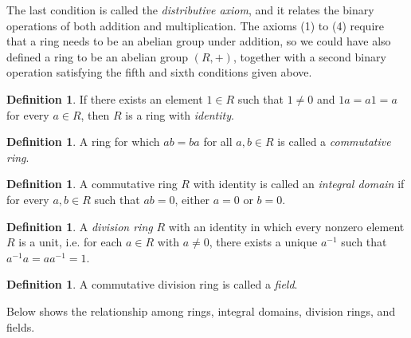 \documentclass[11pt]{book}
\theoremstyle{definition}\newtheorem{definition}[subsection]{Definition}
\theoremstyle{definition}\newtheorem{example}[subsection]{Example}
\theoremstyle{definition}\newtheorem{notation}[subsection]{Notation}
\theoremstyle{definition}\newtheorem{remark}[subsection]{Remark}
\theoremstyle{theorem}\newtheorem{theorem}[subsection]{Theorem}
\theoremstyle{theorem}\newtheorem{lemma}[subsection]{Lemma}
\theoremstyle{theorem}\newtheorem{proposition}[subsection]{Proposition}
\theoremstyle{theorem}\newtheorem{corollary}[subsection]{Corollary}
\begin{document}
The last condition is called the \emph{distributive axiom}, and it relates the binary operations of both addition and multiplication. The axioms (1) to (4) require that a ring needs to be an abelian group under addition, so we could have also defined a ring to be an abelian group $(R, +)$, together with a second binary operation satisfying the fifth and sixth conditions given above.   

\begin{definition}\label{definition:1.1.2} 
    If there exists an element $1 \in R$ such that $1 \neq 0$ and $1a = a1 = a$ for every $a \in R$, then $R$ is a ring with \emph{identity}.
\end{definition}

\begin{definition}\label{definition:1.1.3} 
    A ring for which $ab = ba$ for all $a, b \in R$ is called a \emph{commutative ring}.
\end{definition}

\begin{definition}\label{definition:1.1.4}
    A commutative ring $R$ with identity is called an \emph{integral domain} if for every $a, b \in R$ such that $ab = 0$, either $a = 0$ or $b = 0$.
\end{definition}

\begin{definition}\label{definition:1.1.5}
    A \emph{division ring} $R$ with an identity in which every nonzero element $R$ is a unit, i.e. for each $a \in R$ with $a \neq 0$, there exists a unique $a^{-1}$ such that $a^{-1} a = aa^{-1} = 1$.
\end{definition}

\begin{definition}\label{definition:1.1.6}
    A commutative division ring is called a \emph{field}.
\end{definition}

Below shows the relationship among rings, integral domains, division rings, and fields.
\begin{center}
\end{center}
\end{document}
